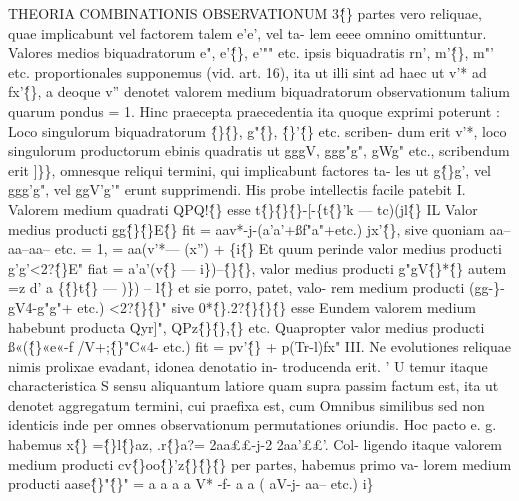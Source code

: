\documentclass[12pt,a4paper]{article}
\begin{document}
 THEORIA COMBINATIONIS OBSERVATIONUM
3\^\{\} partes vero reliquae, quae implicabunt vel factorem talem e'e', vel ta-
lem eeee omnino omittuntur. Valores medios biquadratorum e", e'\^\{\}, e'"" etc.
ipsis biquadratis rn', m'\^\{\}, m"' etc. proportionales supponemus (vid. art. 16), ita ut
illi sint ad haec ut v'* ad fx'\^\{\}, a deoque v'' denotet valorem medium biquadratorum
observationum talium quarum pondus = 1. Hinc praecepta praecedentia ita
quoque exprimi poterunt : Loco singulorum biquadratorum \^\{\}\^\{\}, g"\^\{\}, \^\{\}'\^\{\} etc. scriben-
dum erit v'*, loco singulorum productorum ebinis quadratis ut gggV, ggg"g", gWg"
etc., scribendum erit ]\}\}, omnesque reliqui termini, qui implicabunt factores ta-
les ut g\^\{\}g', vel ggg'g", vel ggV'g'" erunt supprimendi.
His probe intellectis facile patebit
I. Valorem medium quadrati QPQ!\^\{\} esse t\^\{\}\^\{\}\^\{\}-[-\{t\^\{\}'k --- tc)(jl\^\{\}
IL Valor medius producti gg\^\{\}\^\{\}E\^\{\} fit = aav*-j-(a'a'+ßf"a"+etc.) jx'\^\{\}, sive
quoniam aa--aa--aa-- etc. = 1,
= aa(v'*--- (x'') + \{i\^\{\}
Et quum perinde valor medius producti g'g'<2?\^\{\}E" fiat = a'a'(v\^\{\} --- i\})--\^\{\}\^\{\}, valor
medius producti g"gV\^\{\}*\^\{\} autem =z d' a \{\^\{\}t\^\{\} --- )\}) -- l\^\{\} et sie porro, patet, valo-
rem medium producti (gg-\}-gV4-g"g"+ etc.) <2?\^\{\}\^\{\}" sive 0*\^\{\}.2?\^\{\}\^\{\}\^\{\} esse
Eundem valorem medium habebunt producta Qyr]", QPz\^\{\}\^\{\},\^\{\} etc. Quapropter
valor medius producti ß«(\^\{\}«e«-f /V+;\^\{\}"C«4- etc.) fit
= pv'\^\{\} + p(Tr-l)fx"
III. Ne evolutiones reliquae nimis prolixae evadant, idonea denotatio in-
troducenda erit. ' U temur itaque characteristica S sensu aliquantum latiore quam
supra passim factum est, ita ut denotet aggregatum termini, cui praefixa est, cum
Omnibus similibus sed non identicis inde per omnes observationum permutationes
oriundis. Hoc pacto e. g. habemus x\^\{\} =\^\{\}l\^\{\}az, .r\^\{\}a?\textregistered = 2aa££-j-2 2aa'££'. Col-
ligendo itaque valorem medium producti cv\^\{\}oo\^\{\}'z\^\{\}\^\{\}\^\{\} per partes, habemus primo va-
lorem medium producti aase\^\{\}"\^\{\}"
= a a a a V* -f- a a ( aV-j- aa-- etc.) i\}
\end{document}
